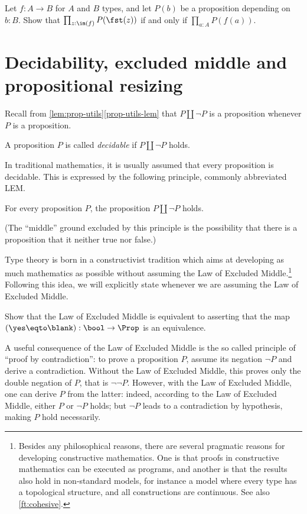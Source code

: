\begin{xca}\label{xca:all-prop-image}
Let $f:A\to B$ for $A$ and $B$ types, and let $P(b)$ be a proposition
depending on $b:B$.
Show that $\prod_{z:\im(f)} P(\fst(z))$ if and only if $\prod_{a:A} P(f(a))$.
\end{xca}



\section{Decidability, excluded middle and propositional resizing}
\label{sec:decidability}

Recall from \cref{lem:prop-utils}\ref{prop-utils-lem} that $P\amalg \neg P$ is a proposition whenever $P$ is a proposition.
\begin{definition}\label{def:decidability}
  A proposition $P$ is called \emph{decidable}
  if $P\amalg\neg P$ holds.
\end{definition}
In traditional mathematics, it is usually assumed that
every proposition is decidable.
This is expressed by the following principle, commonly abbreviated LEM.
\begin{principle}
  \label{pri:lem}%
  For every proposition $P$, the proposition $P \amalg \neg P$ holds.
\end{principle}

(The ``middle'' ground excluded by this principle is the possibility that there
is a proposition that it neither true nor false.)

Type theory is born
in a constructivist tradition
which aims at developing as much mathematics as
possible without assuming the Law of Excluded Middle.\footnote{%
  Besides any philosophical reasons,
  there are several pragmatic reasons
  for developing constructive mathematics.
  One is that proofs in constructive mathematics
  can be executed as programs,
  and another is that the results also hold in non-standard models,
  for instance a model where every type has a topological structure,
  and all constructions are continuous.
  See also \cref{ft:cohesive}.}
Following this idea, we will
explicitly state whenever we are assuming the Law of Excluded Middle.
\begin{xca}\label{xca:lem-prop}
  Show that the Law of Excluded Middle is equivalent to asserting
  that the map $(\yes \eqto \blank) : \bool \to \Prop$
  is an equivalence.
\end{xca}
A useful consequence of the Law of Excluded Middle is the so called principle of ``proof by
contradiction'': to prove a proposition $P$, assume its negation $\neg P$
and derive a contradiction. Without the Law of Excluded Middle, this proves only the double negation of
$P$, that is $\neg \neg P$.  However, with the Law of Excluded Middle, one can derive $P$
from the latter: indeed, according to the Law of Excluded Middle, either $P$ or $\neg P$ holds;
but $\neg P$ leads to a contradiction by hypothesis, making $P$ hold
necessarily.

